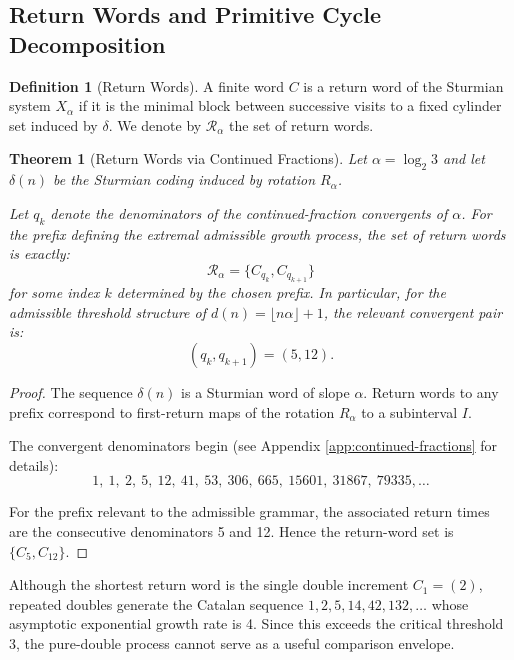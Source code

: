 \documentclass[12pt, oneside]{article}
\numberwithin{equation}{section}
\theoremstyle{definition}
\newtheorem{definition}{Definition}[section]
\theoremstyle{plain}
\newtheorem{theorem}{Theorem}[section]
\theoremstyle{remark}
\begin{document}

\subsection{Return Words and Primitive Cycle Decomposition}

\begin{definition}[Return Words]
A finite word $C$ is a return word of the Sturmian system $X_\alpha$ if it is
the minimal block between successive visits to a fixed cylinder set induced by
$\delta$. We denote by $\mathcal{R}_\alpha$ the set of return words.
\end{definition}

\begin{theorem}[Return Words via Continued Fractions]
Let $\alpha = \log_2 3$ and let $\delta(n)$ be the Sturmian coding induced
by rotation $R_\alpha$.

Let $q_k$ denote the denominators of the continued-fraction convergents of $\alpha$.
For the prefix defining the extremal admissible growth process, the set of return
words is exactly:
\[
\mathcal{R}_\alpha = \{C_{q_k}, C_{q_{k+1}}\}
\]
for some index $k$ determined by the chosen prefix.  In particular, for the admissible
threshold structure of $d(n)=\lfloor n\alpha \rfloor +1$, the relevant convergent pair is:
\[
(q_k, q_{k+1}) = (5,12).
\]
\end{theorem}

\begin{proof}
The sequence $\delta(n)$ is a Sturmian word of slope $\alpha$.
Return words to any prefix correspond to first-return maps of the rotation
$R_\alpha$ to a subinterval $I$.

The convergent denominators begin (see Appendix \ref{app:continued-fractions} for details):
\[
1,\ 1,\ 2,\ 5,\ 12,\ 41,\ 53,\ 306,\ 665,\ 15601,\ 31867,\ 79335,\ldots
\]

For the prefix relevant to the admissible grammar, the associated return times are the
consecutive denominators 5 and 12. Hence the return-word set is $\{C_5, C_{12}\}$.
\end{proof}

Although the shortest return word is the single double increment $C_1=(2)$, repeated doubles generate the
Catalan sequence $1,2,5,14,42,132,\ldots$ whose asymptotic exponential growth rate is 4. Since this
exceeds the critical threshold 3, the pure-double process cannot serve as a useful comparison envelope.
\end{document}

